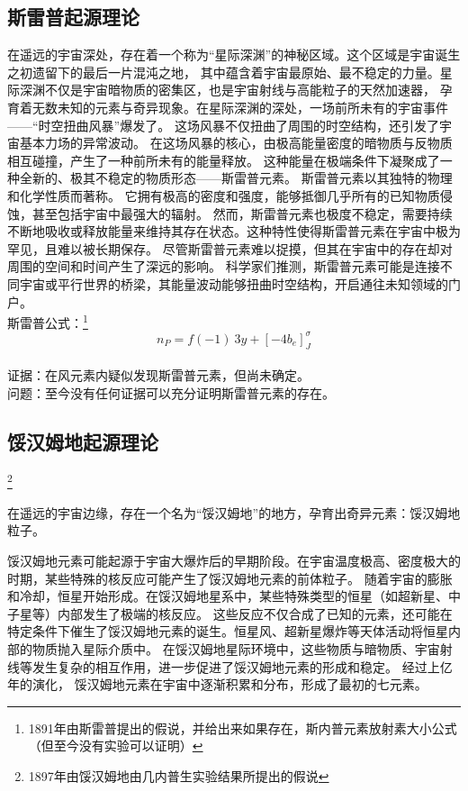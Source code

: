 \documentclass[12pt,a4paper]{article}%
\begin{document}
\subsection{斯雷普起源理论}
在遥远的宇宙深处，存在着一个称为“星际深渊”的神秘区域。这个区域是宇宙诞生之初遗留下的最后一片混沌之地，
其中蕴含着宇宙最原始、最不稳定的力量。星际深渊不仅是宇宙暗物质的密集区，也是宇宙射线与高能粒子的天然加速器，
孕育着无数未知的元素与奇异现象。在星际深渊的深处，一场前所未有的宇宙事件——“时空扭曲风暴”爆发了。
这场风暴不仅扭曲了周围的时空结构，还引发了宇宙基本力场的异常波动。
在这场风暴的核心，由极高能量密度的暗物质与反物质相互碰撞，产生了一种前所未有的能量释放。
这种能量在极端条件下凝聚成了一种全新的、极其不稳定的物质形态——斯雷普元素。
斯雷普元素以其独特的物理和化学性质而著称。
它拥有极高的密度和强度，能够抵御几乎所有的已知物质侵蚀，甚至包括宇宙中最强大的辐射。
然而，斯雷普元素也极度不稳定，需要持续不断地吸收或释放能量来维持其存在状态。这种特性使得斯雷普元素在宇宙中极为罕见，且难以被长期保存。
尽管斯雷普元素难以捉摸，但其在宇宙中的存在却对周围的空间和时间产生了深远的影响。
科学家们推测，斯雷普元素可能是连接不同宇宙或平行世界的桥梁，其能量波动能够扭曲时空结构，开启通往未知领域的门户。
\\
斯雷普公式：\footnote[13]{1891年由斯雷普提出的假说，并给出来如果存在，斯内普元素放射素大小公式（但至今没有实验可以证明）}
\begin{equation}
n_P=f(−1)~3y+[−4b_e]_J^σ
\end{equation}
\\
证据：在风元素内疑似发现斯雷普元素，但尚未确定。\\
问题：至今没有任何证据可以充分证明斯雷普元素的存在。

\subsection{馁汉姆地起源理论}\footnote[14]{1897年由馁汉姆地由几内普生实验结果所提出的假说}

在遥远的宇宙边缘，存在一个名为“馁汉姆地”的地方，孕育出奇异元素：馁汉姆地粒子。


馁汉姆地元素可能起源于宇宙大爆炸后的早期阶段。在宇宙温度极高、密度极大的时期，某些特殊的核反应可能产生了馁汉姆地元素的前体粒子。
随着宇宙的膨胀和冷却，恒星开始形成。在馁汉姆地星系中，某些特殊类型的恒星（如超新星、中子星等）内部发生了极端的核反应。
这些反应不仅合成了已知的元素，还可能在特定条件下催生了馁汉姆地元素的诞生。恒星风、超新星爆炸等天体活动将恒星内部的物质抛入星际介质中。
在馁汉姆地星际环境中，这些物质与暗物质、宇宙射线等发生复杂的相互作用，进一步促进了馁汉姆地元素的形成和稳定。
经过上亿年的演化， 馁汉姆地元素在宇宙中逐渐积累和分布，形成了最初的七元素。
\end{document}
